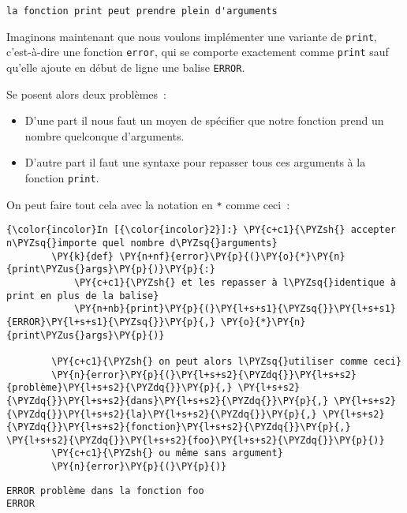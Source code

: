     \begin{Verbatim}[commandchars=\\\{\},frame=single,framerule=0.3mm,rulecolor=\color{cellframecolor}]
la fonction print peut prendre plein d'arguments
\end{Verbatim}

    Imaginons maintenant que nous voulons implémenter une variante de
\texttt{print}, c'est-à-dire une fonction \texttt{error}, qui se
comporte exactement comme \texttt{print} sauf qu'elle ajoute en début de
ligne une balise \texttt{ERROR}.

Se posent alors deux problèmes~:

\begin{itemize}
\tightlist
\item
  D'une part il nous faut un moyen de spécifier que notre fonction prend
  un nombre quelconque d'arguments.
\item
  D'autre part il faut une syntaxe pour repasser tous ces arguments à la
  fonction \texttt{print}.
\end{itemize}

On peut faire tout cela avec la notation en \texttt{*} comme ceci~:

    \begin{Verbatim}[commandchars=\\\{\},frame=single,framerule=0.3mm,rulecolor=\color{cellframecolor}]
{\color{incolor}In [{\color{incolor}2}]:} \PY{c+c1}{\PYZsh{} accepter n\PYZsq{}importe quel nombre d\PYZsq{}arguments}
        \PY{k}{def} \PY{n+nf}{error}\PY{p}{(}\PY{o}{*}\PY{n}{print\PYZus{}args}\PY{p}{)}\PY{p}{:}
            \PY{c+c1}{\PYZsh{} et les repasser à l\PYZsq{}identique à print en plus de la balise}
            \PY{n+nb}{print}\PY{p}{(}\PY{l+s+s1}{\PYZsq{}}\PY{l+s+s1}{ERROR}\PY{l+s+s1}{\PYZsq{}}\PY{p}{,} \PY{o}{*}\PY{n}{print\PYZus{}args}\PY{p}{)}
        
        \PY{c+c1}{\PYZsh{} on peut alors l\PYZsq{}utiliser comme ceci}
        \PY{n}{error}\PY{p}{(}\PY{l+s+s2}{\PYZdq{}}\PY{l+s+s2}{problème}\PY{l+s+s2}{\PYZdq{}}\PY{p}{,} \PY{l+s+s2}{\PYZdq{}}\PY{l+s+s2}{dans}\PY{l+s+s2}{\PYZdq{}}\PY{p}{,} \PY{l+s+s2}{\PYZdq{}}\PY{l+s+s2}{la}\PY{l+s+s2}{\PYZdq{}}\PY{p}{,} \PY{l+s+s2}{\PYZdq{}}\PY{l+s+s2}{fonction}\PY{l+s+s2}{\PYZdq{}}\PY{p}{,} \PY{l+s+s2}{\PYZdq{}}\PY{l+s+s2}{foo}\PY{l+s+s2}{\PYZdq{}}\PY{p}{)}
        \PY{c+c1}{\PYZsh{} ou même sans argument}
        \PY{n}{error}\PY{p}{(}\PY{p}{)}
\end{Verbatim}


    \begin{Verbatim}[commandchars=\\\{\},frame=single,framerule=0.3mm,rulecolor=\color{cellframecolor}]
ERROR problème dans la fonction foo
ERROR
\end{Verbatim}

